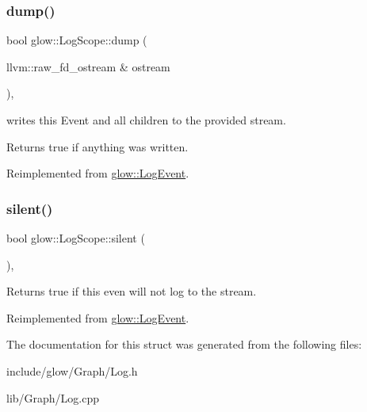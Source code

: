 \subsubsection{\texorpdfstring{dump()}{dump()}}
{\footnotesize\ttfamily bool glow\+::\+Log\+Scope\+::dump (\begin{DoxyParamCaption}\item[{llvm\+::raw\+\_\+fd\+\_\+ostream \&}]{ostream }\end{DoxyParamCaption})\hspace{0.3cm}{\ttfamily [override]}, {\ttfamily [virtual]}}

writes this Event and all children to the provided stream. \begin{DoxyReturn}{Returns}
true if anything was written. 
\end{DoxyReturn}


Reimplemented from \hyperlink{structglow_1_1_log_event_a1c25aa690ea65f6b184ba3133fd6c564}{glow\+::\+Log\+Event}.

\mbox{\label{structglow_1_1_log_scope_a4e7568406d6fec066b79bee89d0a9d1a}} 
\subsubsection{\texorpdfstring{silent()}{silent()}}
{\footnotesize\ttfamily bool glow\+::\+Log\+Scope\+::silent (\begin{DoxyParamCaption}{ }\end{DoxyParamCaption})\hspace{0.3cm}{\ttfamily [override]}, {\ttfamily [virtual]}}

\begin{DoxyReturn}{Returns}
true if this even will not log to the stream. 
\end{DoxyReturn}


Reimplemented from \hyperlink{structglow_1_1_log_event_acca8974ed27e0896a63af715ec912fa1}{glow\+::\+Log\+Event}.



The documentation for this struct was generated from the following files\+:\begin{DoxyCompactItemize}
\item 
include/glow/\+Graph/Log.\+h\item 
lib/\+Graph/Log.\+cpp\end{DoxyCompactItemize}
